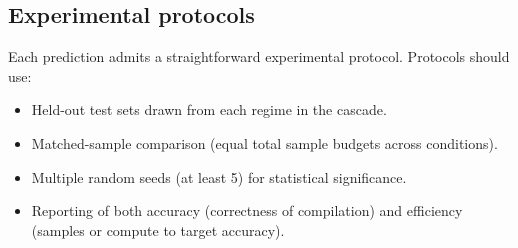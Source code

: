 \documentclass[twocolumn,11pt,a4paper]{article}
\begin{document}
\subsection{Experimental protocols}

Each prediction admits a straightforward experimental protocol. Protocols should use:
\begin{itemize}[leftmargin=*,itemsep=1pt]
\item Held-out test sets drawn from each regime in the cascade.
\item Matched-sample comparison (equal total sample budgets across conditions).
\item Multiple random seeds (at least 5) for statistical significance.
\item Reporting of both accuracy (correctness of compilation) and efficiency (samples or compute to target accuracy).
\end{itemize}
\end{document}
